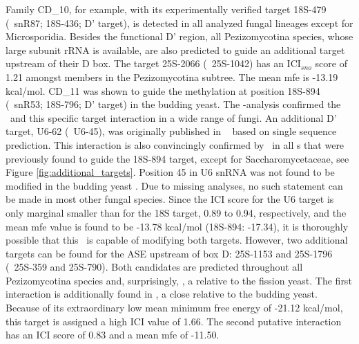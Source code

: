 Family CD\_10, for example, with its experimentally verified target 18S-479
(\sce\ snR87; 18S-436; D' target), is detected in all analyzed fungal
lineages except for Microsporidia. Besides the functional D' region,
all Pezizomycotina species, whose large subunit rRNA is available, are
also predicted to guide an additional target upstream of their D
box. The target 25S-2066 (\ncr\ 25S-1042) has an ICI$_{sno}$ score of
1.21 amongst members in the Pezizomycotina subtree. The mean mfe is -13.19 kcal/mol.
CD\_11 was shown to guide the methylation at position 18S-894 (\sce\ snR53;
18S-796; D' target) in the budding yeast. The \snostrip-analysis
confirmed the \sno\ and this specific target interaction in a wide
range of fungi. An additional D' target, U6-62 (\sce\ U6-45), was
originally published in \ncr\ \cite{Liu:2009} based on single sequence
prediction. This interaction is also convincingly 
confirmed by \snostrip\ in all \sno s that were previously found to guide the
18S-894 target, except for Saccharomycetaceae, see Figure
\ref{fig:additional_targets}. Position 45 in U6 snRNA was not found to
be modified in the budding yeast
\cite{Machnicka:2013, Massenet:1998}. Due to missing analyses, no such
statement can be made in most other
fungal species. Since the ICI score for the U6 target is only marginal
smaller than for the 18S target, 0.89 to 0.94, respectively, and the
mean mfe value is found to be -13.78 kcal/mol (18S-894: -17.34), it is
thoroughly possible that this \sno\ is capable of modifying both
targets. However, two additional targets can be found for
the ASE upstream of box D: 25S-1153 and 25S-1796 (\ncr\ 25S-359 and
25S-790). Both candidates are predicted throughout all Pezizomycotina
species and, surprisingly, \Tde, a relative to the fission yeast. The
first interaction is additionally found in \Yli, a close
relative to the budding yeast. Because of its extraordinary low mean
minimum free energy of -21.12 kcal/mol, this target is assigned a high
ICI value of 1.66. The second putative interaction has an ICI score of
0.83 and a mean mfe of -11.50.


